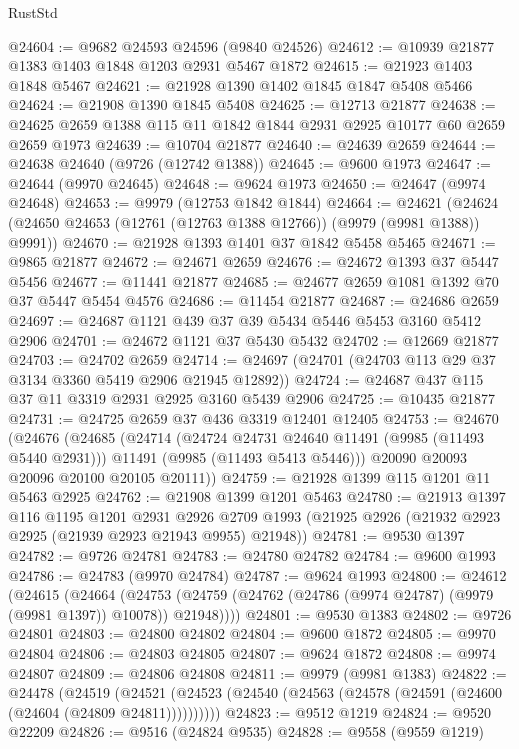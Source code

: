 \begin{lexlean}{RustStd}
\begin{coremodule}
@24604 := @9682 @24593 @24596 (@9840 @24526)
@24612 := @10939 @21877 @1383 @1403 @1848 @1203 @2931 @5467 @1872
@24615 := @21923 @1403 @1848 @5467
@24621 := @21928 @1390 @1402 @1845 @1847 @5408 @5466
@24624 := @21908 @1390 @1845 @5408
@24625 := @12713 @21877
@24638 := @24625 @2659 @1388 @115 @11 @1842 @1844 @2931 @2925 @10177 @60 @2659 @2659 @1973
@24639 := @10704 @21877
@24640 := @24639 @2659
@24644 := @24638 @24640 (@9726 (@12742 @1388))
@24645 := @9600 @1973
@24647 := @24644 (@9970 @24645)
@24648 := @9624 @1973
@24650 := @24647 (@9974 @24648)
@24653 := @9979 (@12753 @1842 @1844)
@24664 := @24621 (@24624 (@24650 @24653 (@12761 (@12763 @1388 @12766)) (@9979 (@9981 @1388)) @9991))
@24670 := @21928 @1393 @1401 @37 @1842 @5458 @5465
@24671 := @9865 @21877
@24672 := @24671 @2659
@24676 := @24672 @1393 @37 @5447 @5456
@24677 := @11441 @21877
@24685 := @24677 @2659 @1081 @1392 @70 @37 @5447 @5454 @4576
@24686 := @11454 @21877
@24687 := @24686 @2659
@24697 := @24687 @1121 @439 @37 @39 @5434 @5446 @5453 @3160 @5412 @2906
@24701 := @24672 @1121 @37 @5430 @5432
@24702 := @12669 @21877
@24703 := @24702 @2659
@24714 := @24697 (@24701 (@24703 @113 @29 @37 @3134 @3360 @5419 @2906 @21945 @12892))
@24724 := @24687 @437 @115 @37 @11 @3319 @2931 @2925 @3160 @5439 @2906
@24725 := @10435 @21877
@24731 := @24725 @2659 @37 @436 @3319 @12401 @12405
@24753 := @24670
    (@24676
      (@24685
        (@24714
          (@24724 @24731 @24640 @11491 (@9985 (@11493 @5440 @2931)))
          @11491
          (@9985 (@11493 @5413 @5446)))
        @20090
        @20093
        @20096
        @20100
        @20105
        @20111))
@24759 := @21928 @1399 @115 @1201 @11 @5463 @2925
@24762 := @21908 @1399 @1201 @5463
@24780 := @21913
    @1397
    @116
    @1195
    @1201
    @2931
    @2926
    @2709
    @1993
    (@21925 @2926 (@21932 @2923 @2925 (@21939 @2923 @21943 @9955) @21948))
@24781 := @9530 @1397
@24782 := @9726 @24781
@24783 := @24780 @24782
@24784 := @9600 @1993
@24786 := @24783 (@9970 @24784)
@24787 := @9624 @1993
@24800 := @24612
    (@24615
      (@24664
        (@24753 (@24759 (@24762 (@24786 (@9974 @24787) (@9979 (@9981 @1397)) @10078)) @21948))))
@24801 := @9530 @1383
@24802 := @9726 @24801
@24803 := @24800 @24802
@24804 := @9600 @1872
@24805 := @9970 @24804
@24806 := @24803 @24805
@24807 := @9624 @1872
@24808 := @9974 @24807
@24809 := @24806 @24808
@24811 := @9979 (@9981 @1383)
@24822 := @24478
    (@24519 (@24521 (@24523 (@24540 (@24563 (@24578 (@24591 (@24600 (@24604 (@24809 @24811))))))))))
@24823 := @9512 @1219
@24824 := @9520 @22209
@24826 := @9516 (@24824 @9535)
@24828 := @9558 (@9559 @1219)

\end{coremodule}
\end{lexlean}
